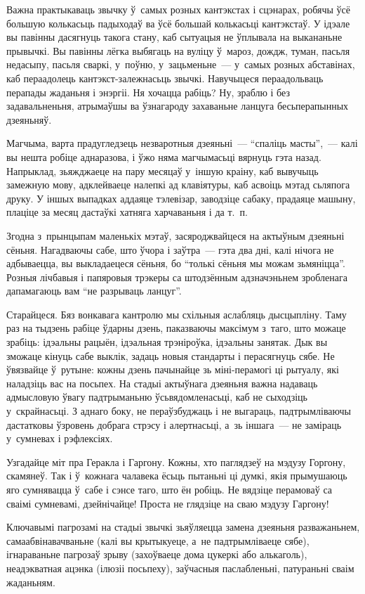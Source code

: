 Важна практыкаваць звычку ў~самых розных кантэкстах і сцэнарах, робячы ўсё большую колькасьць падыходаў ва ўсё большай колькасьці кантэкстаў. У ідэале вы павінны дасягнуць такога стану, каб сытуацыя не ўплывала на выкананьне прывычкі. Вы павінны лёгка выбягаць на вуліцу ў~мароз, дождж, туман, пасьля недасыпу, пасьля сваркі, у~поўню, у~зацьменьне~--- у~самых розных абставінах, каб пераадолець кантэкст-залежнасьць звычкі. Навучыцеся пераадольваць перапады жаданьня і энэргіі. Ня хочацца рабіць? Ну, зраблю і без задавальненьня, атрымаўшы ва ўзнагароду захаваньне ланцуга бесьперапынных дзеяньняў.

Магчыма, варта прадугледзець незваротныя дзеяньні~--- ``спаліць масты'',~--- калі вы нешта робіце аднаразова, і ўжо няма магчымасьці вярнуць гэта назад. Напрыклад, зьяжджаеце на пару месяцаў у~іншую краіну, каб вывучыць замежную мову, адклейваеце налепкі ад клавіятуры, каб асвоіць мэтад сьляпога друку. У іншых выпадках аддаяце тэлевізар, заводзіце сабаку, прадаяце машыну, плаціце за месяц дастаўкі хатняга харчаваньня і да т.~п.

Згодна з~прынцыпам маленькіх мэтаў, засяроджвайцеся на актыўным дзеяньні сёньня. Нагадваючы сабе, што ўчора і заўтра~--- гэта два дні, калі нічога не адбываецца, вы выкладаецеся сёньня, бо ``толькі сёньня мы можам зьмяніцца''. Розныя лічбавыя і папяровыя трэкеры са штодзённым адзначэньнем зробленага дапамагаюць вам ``не разрываць ланцуг''.

Старайцеся. Бяз вонкавага кантролю мы схільныя аслабляць дысцыпліну. Таму раз на тыдзень рабіце ўдарны дзень, паказваючы максімум з~таго, што можаце зрабіць: ідэальны рацыён, ідэальная трэніроўка, ідэальны занятак. Дык вы зможаце кінуць сабе выклік, задаць новыя стандарты і перасягнуць сябе. Не ўвязвайце ў~рутыне: кожны дзень пачынайце зь міні-перамогі ці рытуалу, які наладзіць вас на посьпех. На стадыі актыўнага дзеяньня важна надаваць адмысловую ўвагу падтрыманьню ўсьвядомленасьці, каб не сыходзіць у~скрайнасьці. З аднаго боку, не пераўзбуджаць і не выгараць, падтрымліваючы дастатковы ўзровень добрага стрэсу і алертнасьці, а~зь іншага~--- не заміраць у~сумневах і рэфлексіях.

Узгадайце міт пра Геракла і Гаргону. Кожны, хто паглядзеў на мэдузу Горгону, скамянеў. Так і ў~кожнага чалавека ёсьць пытаньні ці думкі, якія прымушаюць яго сумнявацца ў~сабе і сэнсе таго, што ён робіць. Не вядзіце перамоваў са сваімі сумневамі, дзейнічайце! Проста не глядзіце на сваю мэдузу Гаргону!

Ключавымі пагрозамі на стадыі звычкі зьяўляецца замена дзеяньня разважаньнем, самаабвінавачваньне (калі вы крытыкуеце, а~не падтрымліваеце сябе), ігнараваньне пагрозаў зрыву (захоўваеце дома цукеркі або алькаголь), неадэкватная ацэнка (ілюзіі посьпеху), заўчасныя паслабленьні, патураньні сваім жаданьням.

